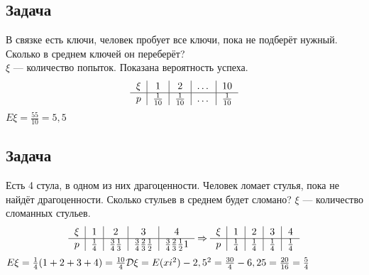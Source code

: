 \documentclass[12pt, a4paper]{article}
\begin{document}
    \subsection*{Задача}
    В связке есть ключи, человек пробует все ключи, пока не подберёт нужный. Сколько в среднем ключей он переберёт?\\
    $\xi$ --- количество попыток. Показана вероятность успеха.
    \[\begin{tabular}{c|c|c|c|c}
        $\xi$ & 1 & 2 & $\dots$ & 10\\
        \hline
        $p$ & $\frac{1}{10}$ & $\frac{1}{10}$ & $\dots$ & $\frac{1}{10}$
    \end{tabular}\]
    $E\xi = \frac{55}{10} = 5,5$
    \subsection*{Задача}
    Есть 4 стула, в одном из них драгоценности. Человек ломает стулья, пока не найдёт драгоценности. Сколько стульев в среднем будет сломано?
    $\xi$ --- количество сломанных стульев.
    \[\begin{tabular}{c|c|c|c|c}
        $\xi$ & 1 & 2 & 3 & 4\\
        \hline
        $p$ & $\frac{1}{4}$ & $\frac{3}{4}\frac{1}{3}$ & $\frac{3}{4}\frac{2}{3}\frac{1}{2}$ & $\frac{3}{4}\frac{2}{3}\frac{1}{2}1$
    \end{tabular}\Rightarrow \begin{tabular}{c|c|c|c|c}
        $\xi$ & 1 & 2 & 3 & 4\\
        \hline
        $p$ & $\frac{1}{4}$ & $\frac{1}{4}$ & $\frac{1}{4}$ & $\frac{1}{4}$
    \end{tabular}\]
    $E\xi = \frac{1}{4}(1 + 2 + 3 + 4) = \frac{10}{4}\\
    \mathcal{D}\xi = E(xi^2) - 2,5^2 = \frac{30}{4} - 6,25 = \frac{20}{16} = \frac{5}{4}$
\end{document}
